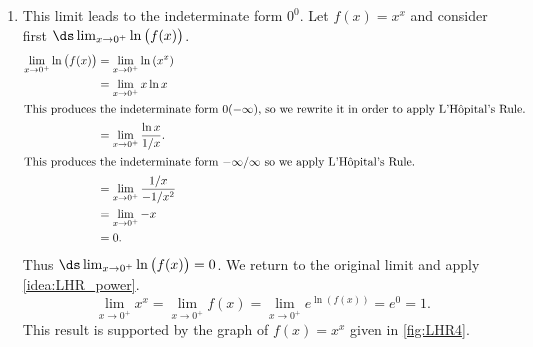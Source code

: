 {\begin{enumerate}
\item		This limit leads to the indeterminate form $0^0$. Let $f(x) = x^x$ and consider first $\ds\lim_{x\to0^+} \ln\big(f(x)\big)$. 
%
%
%
\begin{align*}
\lim_{x\to0^+} \ln\big(f(x)\big) &= \lim_{x\to0^+} \ln\left(x^x\right) \\
			&= \lim_{x\to0^+} x\ln x \\
			\intertext{This produces the indeterminate form $0(-\infty)$, so we rewrite it in order to apply L'H\^opital's Rule.}
			&= \lim_{x\to0^+} \frac{\ln x}{1/x}.\\
			\intertext{This produces the indeterminate form $-\infty/\infty$ so we apply L'H\^opital's Rule.}
			&=	\lim_{x\to0^+} \frac{1/x}{-1/x^2} \\
			&= \lim_{x\to0^+} -x \\
			&= 0.
\end{align*}%
Thus $\ds\lim_{x\to0^+} \ln\big(f(x)\big) =0$. We return to the original limit and apply \autoref{idea:LHR_power}.
\[
\lim_{x\to0^+} x^x = \lim_{x\to0^+} f(x) = \lim_{x\to0^+} e^{\ln(f(x))} = e^0 = 1.
\]
This result is supported by the graph of $f(x)=x^x$ given in \autoref{fig:LHR4}.\eoehere
\end{enumerate}}




